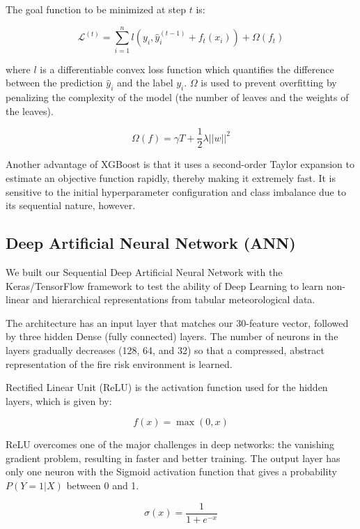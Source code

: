 \documentclass[journal, 10pt, twocolumn]{IEEEtran}
\begin{document}
The goal function to be minimized at step $t$ is:

\begin{equation}
\mathcal{L}^{(t)} = \sum_{i=1}^{n} l(y_i, \hat{y}_i^{(t-1)} + f_t(x_i)) + \Omega(f_t)
\end{equation}

where $l$ is a differentiable convex loss function which quantifies the difference between the prediction $\hat{y}_i$ and the label $y_i$. $\Omega$ is used to prevent overfitting by penalizing the complexity of the model (the number of leaves and the weights of the leaves).

\begin{equation}
\Omega(f) = \gamma T + \frac{1}{2} \lambda ||w||^2
\end{equation}

Another advantage of XGBoost is that it uses a second-order Taylor expansion to estimate an objective function rapidly, thereby making it extremely fast. It is sensitive to the initial hyperparameter configuration and class imbalance due to its sequential nature, however.

\subsection{Deep Artificial Neural Network (ANN)}
We built our Sequential Deep Artificial Neural Network with the Keras/TensorFlow framework to test the ability of Deep Learning to learn non-linear and hierarchical representations from tabular meteorological data.

The architecture has an input layer that matches our 30-feature vector, followed by three hidden Dense (fully connected) layers. The number of neurons in the layers gradually decreases (128, 64, and 32) so that a compressed, abstract representation of the fire risk environment is learned.

Rectified Linear Unit (ReLU) is the activation function used for the hidden layers, which is given by:

\begin{equation}
f(x) = \max(0, x)
\end{equation}

ReLU overcomes one of the major challenges in deep networks: the vanishing gradient problem, resulting in faster and better training. The output layer has only one neuron with the Sigmoid activation function that gives a probability $P(Y=1 | X)$ between 0 and 1.

\begin{equation}
\sigma(x) = \frac{1}{1 + e^{-x}}
\end{equation}
\end{document}
